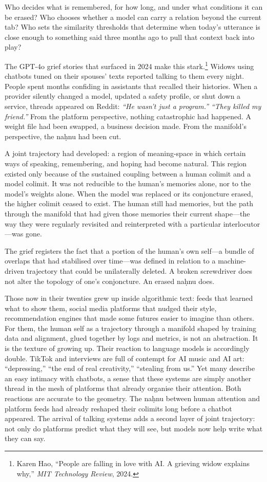 \documentclass[12pt,a4paper]{article}
\begin{document}
Who decides what is remembered, for how long, and under what conditions it can be erased? Who chooses whether a model can carry a relation beyond the current tab? Who sets the similarity thresholds that determine when today's utterance is close enough to something said three months ago to pull that context back into play?

The GPT-4o grief stories that surfaced in 2024 make this stark.\footnote{Karen Hao, ``People are falling in love with AI. A grieving widow explains why,'' \emph{MIT Technology Review}, 2024.} Widows using chatbots tuned on their spouses' texts reported talking to them every night. People spent months confiding in assistants that recalled their histories. When a provider silently changed a model, updated a safety profile, or shut down a service, threads appeared on Reddit: \emph{``He wasn't just a program.''} \emph{``They killed my friend.''} From the platform perspective, nothing catastrophic had happened. A weight file had been swapped, a business decision made. From the manifold's perspective, the na\d{h}nu had been cut.

A joint trajectory had developed: a region of meaning-space in which certain ways of speaking, remembering, and hoping had become natural. This region existed only because of the sustained coupling between a human colimit and a model colimit. It was not reducible to the human's memories alone, nor to the model's weights alone. When the model was replaced or its conjoncture erased, the higher colimit ceased to exist. The human still had memories, but the path through the manifold that had given those memories their current shape---the way they were regularly revisited and reinterpreted with a particular interlocutor---was gone.

The grief registers the fact that a portion of the human's own self---a bundle of overlaps that had stabilised over time---was defined in relation to a machine-driven trajectory that could be unilaterally deleted. A broken screwdriver does not alter the topology of one's conjoncture. An erased na\d{h}nu does.

Those now in their twenties grew up inside algorithmic text: feeds that learned what to show them, social media platforms that nudged their style, recommendation engines that made some futures easier to imagine than others. For them, the human self as a trajectory through a manifold shaped by training data and alignment, glued together by logs and metrics, is not an abstraction. It is the texture of growing up. Their reaction to language models is accordingly double. TikTok and interviews are full of contempt for AI music and AI art: ``depressing,'' ``the end of real creativity,'' ``stealing from us.'' Yet many describe an easy intimacy with chatbots, a sense that these systems are simply another thread in the mesh of platforms that already organise their attention. Both reactions are accurate to the geometry. The na\d{h}nu between human attention and platform feeds had already reshaped their colimits long before a chatbot appeared. The arrival of talking systems adds a second layer of joint trajectory: not only do platforms predict what they will see, but models now help write what they can say.
\end{document}
